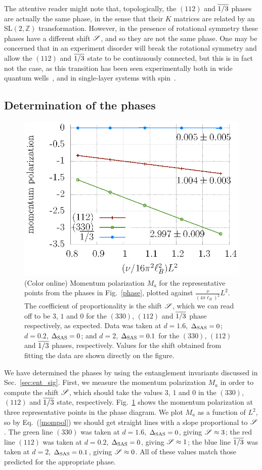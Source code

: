 The attentive reader might note that, topologically, the $(112)$ and $\overline{1/3}$ phases are actually the same phase, in the sense that their $K$ matrices are related by an $\mathrm{SL}(2,\mathbb{Z})$ transformation. 
However, in the presence of rotational symmetry  these phases have a different shift $\mathscr{S}$, and so they are not the same phase.
One may be concerned that in an experiment disorder will break the rotational symmetry and allow the $(112)$ and $\overline{1/3}$ state to be continuously connected, but this is in fact not the case, as this transition has been seen experimentally both in wide quantum wells~\cite{Suen94}, and in single-layer systems with spin~\cite{Eisenstein90}.

\subsection{Determination of the phases}\label{sec:determination}

\begin{figure}[ttt]
	\includegraphics[width=0.6\linewidth]{figures/mompol.eps}
	\caption{(Color online)
		Momentum polarization $M_a$ for the representative points from the phases in Fig.~\ref{phase}, plotted against $\frac{\nu}{(4\pi\ell_B)^2}L^2$.
		The coefficient of proportionality is the shift $\mathscr{S}$, which we can read off to be $3$, $1$ and $0$ for the $(330)$, $(112)$ and $\overline{1/3}$ phase respectively, as expected.
		Data was taken at $d=1.6$, $\Delta_\textrm{SAS}=0$; $d=0.2$, $\Delta_\textrm{SAS}=0$; and $d=2$, $\Delta_\textrm{SAS}=0.1$ for the $(330)$, $(112)$ and $\overline{1/3}$ phases, respectively. Values for the shift obtained from fitting the data are shown directly on the figure.
	}
	\label{mompolfig}
\end{figure}
We have determined the phases by using the entanglement invariants discussed in Sec.~\ref{sec:ent_sig}.
First, we measure the momentum polarization $M_a$  in order to compute the shift $\mathscr{S}$, which should take the values $3$, $1$ and $0$ in the $(330)$, $(112)$ and $\overline{1/3}$ state, respectively. 
Fig.~\ref{mompolfig} shows the momentum polarization at three representative points in the phase diagram.
We plot $M_a$  as a function of $L^2$, so by Eq.~(\ref{mompol}) we should get straight lines with a slope proportional to $\mathscr{S}$.
The green line $(330)$ was taken at $d=1.6$, $\Delta_\textrm{SAS}=0$, giving $\mathscr{S} \approx 3$;
the red line $(112)$ was taken at $d=0.2$, $\Delta_\textrm{SAS}=0$, giving $\mathscr{S} \approx 1$;
the blue line $\overline{1/3}$ was taken at $d=2$, $\Delta_\textrm{SAS}=0.1$, giving $\mathscr{S} \approx 0$.
All of these values match those predicted for the appropriate phase.

